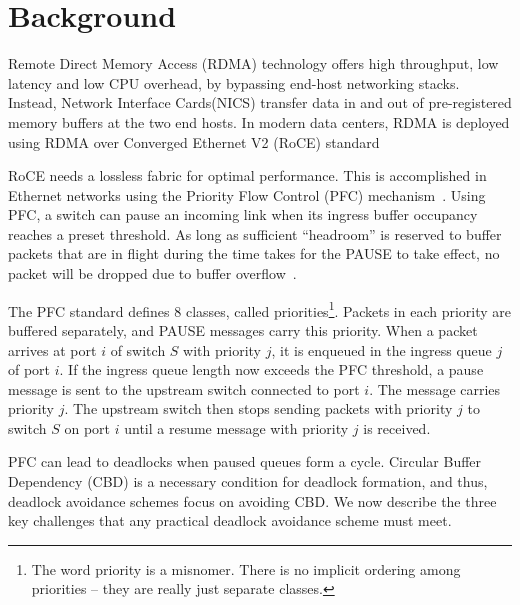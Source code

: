 \section{Background}
\label{sec:background}
 Remote Direct Memory Access (RDMA) technology offers high
throughput, low latency and low CPU overhead, by bypassing end-host networking
stacks. Instead, Network Interface Cards(NICS) transfer data in and out of
pre-registered memory buffers at the two end hosts.  In modern data centers,
RDMA is deployed using RDMA over Converged Ethernet V2 (RoCE)
standard~\cite{roce,rroce}

 RoCE needs a lossless fabric for optimal performance. This is
accomplished in Ethernet networks using the Priority Flow Control (PFC)
mechanism~\cite{pfc}.  Using PFC, a switch can pause an incoming link when its
ingress buffer occupancy reaches a preset threshold. As long as sufficient
``headroom'' is reserved to buffer packets that are in flight during the time
takes for the PAUSE to take effect, no packet will be dropped due to buffer
overflow~\cite{cisco-whitepaper,dcqcn}.

The PFC standard defines 8 classes, called priorities\footnote{The word priority
is a misnomer. There is no implicit ordering among priorities -- they are really
just separate classes.}. Packets in each priority are buffered separately, and
PAUSE messages carry this priority.  When a packet arrives at port $i$ of switch
$S$ with priority $j$, it is enqueued in the ingress queue $j$ of port $i$. If the ingress queue
length now exceeds the PFC threshold, a pause message is sent to the upstream
switch connected to port $i$. The message carries priority $j$. The upstream
switch then stops sending packets with priority $j$ to switch $S$ on port $i$
until a resume message with priority $j$ is received.

 PFC can lead to deadlocks when paused queues form a cycle.
Circular Buffer Dependency (CBD) is a necessary condition for
deadlock formation, and thus, deadlock avoidance schemes focus on
avoiding CBD.  We now describe the three key challenges that any
practical deadlock avoidance scheme must meet.
